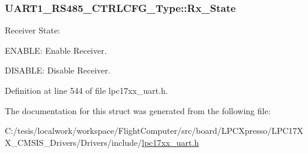\hypertarget{struct_u_a_r_t1___r_s485___c_t_r_l_c_f_g___type_a087a5f4310b65eaf41efc5295b8b841e}{
\subsubsection[{\-Rx\-\_\-\-State}]{ {\bf \-U\-A\-R\-T1\-\_\-\-R\-S485\-\_\-\-C\-T\-R\-L\-C\-F\-G\-\_\-\-Type\-::\-Rx\-\_\-\-State}}}\label{struct_u_a_r_t1___r_s485___c_t_r_l_c_f_g___type_a087a5f4310b65eaf41efc5295b8b841e}
\-Receiver \-State\-:
\begin{DoxyItemize}
\item \-E\-N\-A\-B\-L\-E\-: \-Enable \-Receiver.
\item \-D\-I\-S\-A\-B\-L\-E\-: \-Disable \-Receiver. 
\end{DoxyItemize}

\-Definition at line 544 of file lpc17xx\-\_\-uart.\-h.



\-The documentation for this struct was generated from the following file\-:\begin{DoxyCompactItemize}
\item 
\-C\-:/tesis/localwork/workspace/\-Flight\-Computer/src/board/\-L\-P\-C\-Xpresso/\-L\-P\-C17\-X\-X\-\_\-\-C\-M\-S\-I\-S\-\_\-\-Drivers/\-Drivers/include/\hyperlink{lpc17xx__uart_8h}{lpc17xx\-\_\-uart.\-h}\end{DoxyCompactItemize}
